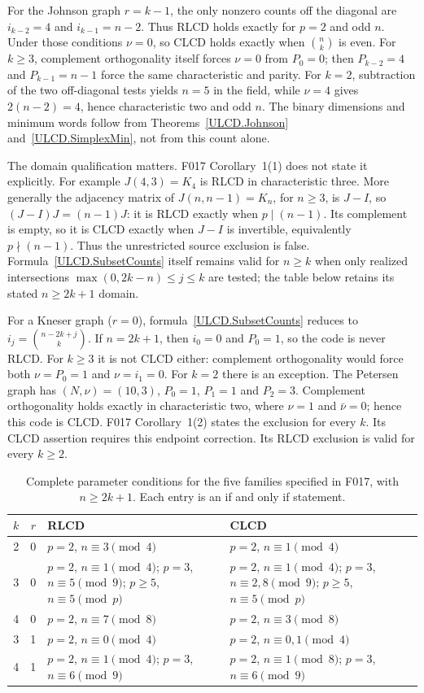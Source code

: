\documentclass[11pt,a4paper]{article}
\numberwithin{equation}{section}
\begin{document}
For the Johnson graph $r=k-1$, the only nonzero counts off the diagonal
are $i_{k-2}=4$ and $i_{k-1}=n-2$. Thus RLCD holds exactly for $p=2$ and
odd $n$. Under those conditions $\nu=0$, so CLCD holds exactly when
$\binom nk$ is even. For $k\geq3$, complement orthogonality itself forces
$\nu=0$ from $P_0=0$;
then $P_{k-2}=4$ and $P_{k-1}=n-1$ force the same characteristic and parity.
For $k=2$, subtraction of the two off-diagonal tests yields $n=5$ in the
field, while $\nu=4$ gives $2(n-2)=4$, hence characteristic two and odd $n$.
The binary dimensions and minimum words follow from Theorems~\ref{ULCD.Johnson} and~\ref{ULCD.SimplexMin}, not from this count alone.

The domain qualification matters. F017 Corollary~1(1) does not state it
explicitly. For example $J(4,3)=K_4$ is RLCD in characteristic three.
More generally the adjacency matrix of $J(n,n-1)=K_n$, for $n\geq3$, is
$J-I$, so $(J-I)J=(n-1)J$: it is RLCD exactly when $p\mid(n-1)$.
Its complement is empty, so it is CLCD exactly when $J-I$ is invertible,
equivalently $p\nmid(n-1)$. Thus the unrestricted source exclusion is false.
Formula~\eqref{ULCD.SubsetCounts} itself remains valid for $n\geq k$ when only
realized intersections $\max(0,2k-n)\leq j\leq k$ are tested; the table
below retains its stated $n\geq2k+1$ domain.

For a Kneser graph ($r=0$), formula~\eqref{ULCD.SubsetCounts} reduces to
$i_j=\binom{n-2k+j}{k}$. If $n=2k+1$, then $i_0=0$ and $P_0=1$, so the
code is never RLCD. For $k\geq3$ it is not CLCD either: complement
orthogonality would force both $\nu=P_0=1$ and $\nu=i_1=0$.
For $k=2$ there is an exception. The Petersen graph has $(N,\nu)=(10,3)$,
$P_0=1$, $P_1=1$ and $P_2=3$. Complement orthogonality holds exactly
in characteristic two, where $\nu=1$ and $\bar\nu=0$; hence this code
is CLCD. F017 Corollary~1(2) states the exclusion for every $k$.
Its CLCD assertion requires this endpoint correction. Its RLCD exclusion
is valid for every $k\geq2$.

\begin{table}[ht]
\centering\small
\begin{tabular}{ccp{}p{}}
\toprule
$k$&$r$&RLCD&CLCD\\\midrule
2&0&$p=2$, $n\equiv3\pmod4$&$p=2$, $n\equiv1\pmod4$\\
3&0&$p=2$, $n\equiv1\pmod4$; $p=3$, $n\equiv5\pmod9$;
$p\geq5$, $n\equiv5\pmod p$&$p=2$, $n\equiv1\pmod4$;
$p=3$, $n\equiv2,8\pmod9$; $p\geq5$, $n\equiv5\pmod p$\\
4&0&$p=2$, $n\equiv7\pmod8$&$p=2$, $n\equiv3\pmod8$\\
3&1&$p=2$, $n\equiv0\pmod4$&$p=2$, $n\equiv0,1\pmod4$\\
4&1&$p=2$, $n\equiv1\pmod4$; $p=3$, $n\equiv6\pmod9$
&$p=2$, $n\equiv1\pmod8$; $p=3$, $n\equiv6\pmod9$\\
\bottomrule
\end{tabular}
\caption{Complete parameter conditions for the five families specified in
F017, with $n\geq2k+1$. Each entry is an if and only if statement.}
\label{ULCD.SubsetFamilies}
\end{table}
\end{document}
